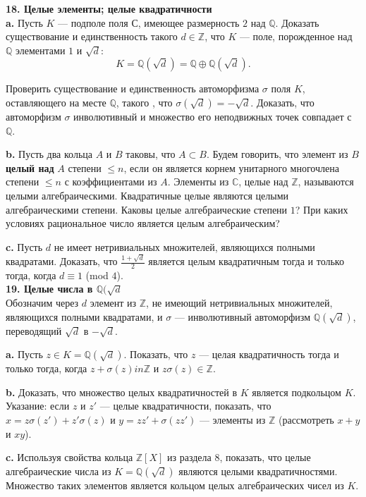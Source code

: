 \noindent \textbf{18. Целые элементы; целые квадратичности}
\\

\textbf{a.} Пусть $K$ — подполе поля $\mathbb{С}$, имеющее размерность $2$ над $\mathbb{Q}$. Доказать существование и единственность такого $d \in \mathbb{Z}$, что $K$ — поле,
порожденное над $\mathbb{Q}$ элементами $1$ и $\sqrt{d}$:
\[
K = \mathbb{Q}(\sqrt{d}) = \mathbb{Q} \oplus \mathbb{Q}(\sqrt{d}).
\]

\noindent Проверить существование и единственность автоморфизма $\sigma$ поля $K$,
оставляющего на месте $\mathbb{Q}$, такого , что $\sigma (\sqrt{d}) = -\sqrt{d}$. Доказать, что автоморфизм $\sigma$ инволютивный и множество его неподвижных точек совпадает с $\mathbb{Q}$.

\textbf{b.} Пусть два кольца $A$ и $B$ таковы, что $A \subset B$. Будем говорить, что элемент из $B$ \textbf{целый над} $A$ степени $\le n$, если он является корнем унитарного многочлена степени $\le n$ с коэффициентами из $A$. Элементы из $\mathbb{C}$, целые над $\mathbb{Z}$, называются целыми алгебраическими. Квадратичные целые являются целыми алгебраическими степени. Каковы целые алгебраические степени $1$? При каких условиях рациональное число является целым алгебраическим?

\textbf{c.} Пусть $d$ не имеет нетривиальных множителей, являющихся полными квадратами. Доказать, что $\frac{1+\sqrt{d}}{2}$ является целым 
квадратичным тогда и только тогда, когда $d \equiv 1$ (mod $4$).
\\

\noindent \textbf{19. Целые числа в $\mathbb{Q}(\sqrt{d}$}
\\

Обозначим через $d$ элемент из $\mathbb{Z}$, не имеющий нетривиальных 
множителей, являющихся полными квадратами, и $\sigma$ — инволютивный 
автоморфизм $\mathbb{Q}(\sqrt{d})$, переводящий $\sqrt{d}$ в $- \sqrt{d}$.

\textbf{a.} Пусть $z \in K = \mathbb{Q}(\sqrt{d})$. Показать, что $z$ — целая квадратичность тогда и только тогда, когда $z+\sigma (z)in \mathbb{Z}$ и $z\sigma (z) \in \mathbb{Z}$.

\textbf{b.} Доказать, что множество целых квадратичностей в $K$ 
является подкольцом $K$. Указание: если $z$ и $z'$ — целые квадратичности, 
показать, что $x=z\sigma(z')+z'\sigma(z)$ и $y=zz'+\sigma(zz')$ — элементы из $\mathbb{Z}$ (рассмотреть $x + y$ и $xy$).

\pagebreak

\textbf{c.} Используя свойства кольца $\mathbb{Z}[X]$ из раздела $8$, показать, что целые алгебраические числа из $K = \mathbb{Q}(\sqrt{d})$ являются целыми квадратичностями. Множество таких элементов является кольцом целых алгебраических чисел из $K$.

